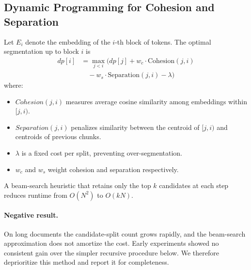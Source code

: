 \subsection{Dynamic Programming for Cohesion and Separation}
\label{sec:method_dp}
Let $E_i$ denote the embedding of the $i$-th block of tokens. The optimal segmentation up to block $i$ is
\begin{align}
dp[i] &= \max_{j < i} \Big( dp[j] + w_c \cdot \mathrm{Cohesion}(j,i) \nonumber\\
&\quad - w_s \cdot \mathrm{Separation}(j,i) - \lambda \Big)
\label{eq:dp_objective}
\end{align}
where:
\begin{itemize}
  \item $Cohesion(j,i)$ measures average cosine similarity among embeddings within $[j,i)$.
  \item $Separation(j,i)$ penalizes similarity between the centroid of $[j,i)$ and centroids of previous chunks.
  \item $\lambda$ is a fixed cost per split, preventing over-segmentation.
  \item $w_c$ and $w_s$ weight cohesion and separation respectively.
\end{itemize}
A beam-search heuristic that retains only the top $k$ candidates at each step reduces runtime from $O(N^2)$ to $O(kN)$.

\paragraph{Negative result.} On long documents the candidate-split count grows rapidly, and the beam-search approximation does not amortize the cost. Early experiments showed no consistent gain over the simpler recursive procedure below. We therefore deprioritize this method and report it for completeness.

